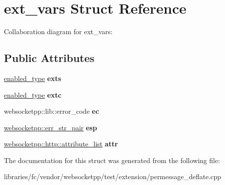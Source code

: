 \hypertarget{structext__vars}{}\section{ext\+\_\+vars Struct Reference}
\label{structext__vars}


Collaboration diagram for ext\+\_\+vars\+:
\subsection*{Public Attributes}
\begin{DoxyCompactItemize}
\item 
\mbox{\label{structext__vars_a1b024f0d53a4e1ab0ed89f3ba2f3b6e9}} 
\mbox{\hyperlink{classwebsocketpp_1_1extensions_1_1permessage__deflate_1_1enabled}{enabled\+\_\+type}} {\bfseries exts}
\item 
\mbox{\label{structext__vars_a9df65e98530d8822748597babc1e14cf}} 
\mbox{\hyperlink{classwebsocketpp_1_1extensions_1_1permessage__deflate_1_1enabled}{enabled\+\_\+type}} {\bfseries extc}
\item 
\mbox{\label{structext__vars_a25675ae1fac85b0ee8a2fb54feb9244a}} 
websocketpp\+::lib\+::error\+\_\+code {\bfseries ec}
\item 
\mbox{\label{structext__vars_a1cb78d1cc907c4761f1cdfa5bf2abb4f}} 
\mbox{\hyperlink{namespacewebsocketpp_abecf95d53c9387716b157daae84441f3}{websocketpp\+::err\+\_\+str\+\_\+pair}} {\bfseries esp}
\item 
\mbox{\label{structext__vars_a50a3f57a467119dcf639f4df92402194}} 
\mbox{\hyperlink{namespacewebsocketpp_1_1http_a9744f4104772b987aa9e86c35ce1357b}{websocketpp\+::http\+::attribute\+\_\+list}} {\bfseries attr}
\end{DoxyCompactItemize}


The documentation for this struct was generated from the following file\+:\begin{DoxyCompactItemize}
\item 
libraries/fc/vendor/websocketpp/test/extension/permessage\+\_\+deflate.\+cpp\end{DoxyCompactItemize}
